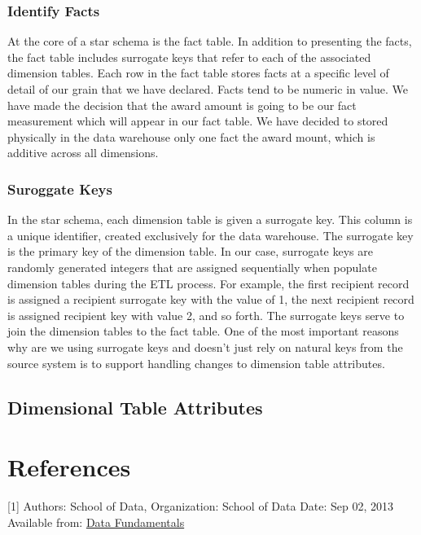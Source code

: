 \documentclass[letterpaper,10pt,oneside]{sphinxmanual}
\begin{document}
\subsection{Identify Facts}
\label{datawarehouse:identify-facts}
At the core of a star schema is the fact table. In addition to presenting the facts, the fact table includes surrogate
keys that refer to each of the associated dimension tables. Each row in the fact table stores facts at a specific
level of detail of our grain that we have declared. Facts tend to be numeric in value. We have made the decision
that the award amount is going to be our fact measurement which will appear in our fact table. We have decided
to stored physically in the data warehouse only one fact the award mount, which is additive across all dimensions.


\subsection{Suroggate Keys}
\label{datawarehouse:suroggate-keys}
In the star schema, each dimension table is given a surrogate key. This column is a unique identifier,
created exclusively for the data warehouse. The surrogate key is the primary key of the dimension table.
In our case, surrogate keys are randomly generated integers that are assigned sequentially when populate
dimension tables during the ETL process. For example, the first recipient record is assigned a recipient
surrogate key with the value of 1, the next recipient record is assigned recipient key with value 2, and
so forth. The surrogate keys serve to join the dimension tables to the fact table. One of the most important
reasons why are we using surrogate keys and doesn’t just rely on natural keys from the source system is to
support handling changes to dimension table attributes.


\section{Dimensional Table Attributes}
\label{datawarehouse:dimensional-table-attributes}

\chapter{References}
\label{references:references}\label{references::doc}
\label{references:id1}{[}1{]} Authors: School of Data, Organization: School of Data Date: Sep 02, 2013 Available from: \href{http://schoolofdata.org/handbook/courses/what-is-data/}{Data Fundamentals}



\renewcommand{\indexname}{Index}
\printindex
\end{document}
